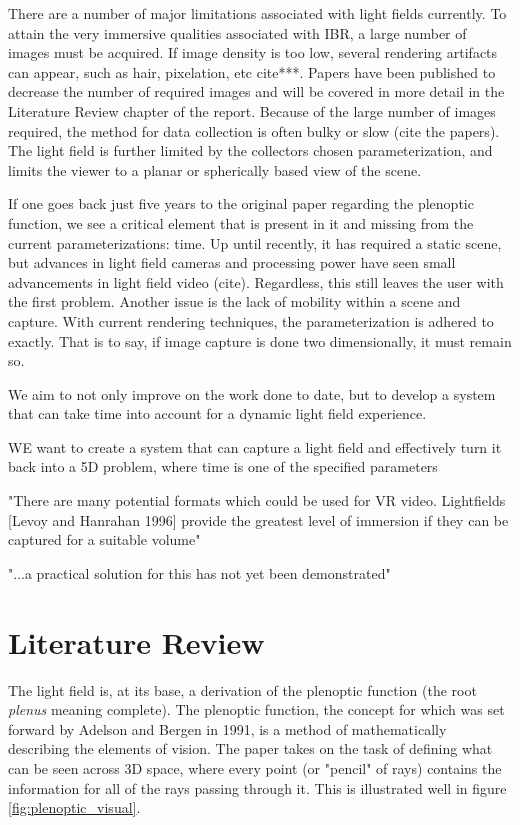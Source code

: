 \documentclass[12pt]{report}
\begin{document}
There are a number of major limitations associated with light fields currently. To attain the very immersive qualities associated with IBR, a large number of images must be acquired. If image density is too low, several rendering artifacts can appear, such as hair, pixelation, etc cite***. Papers have been published to decrease the number of required images and will be covered in more detail in the Literature Review chapter of the report. Because of the large number of images required, the method for data collection is often bulky or slow (cite the papers). The light field is further limited by the collectors chosen parameterization, and limits the viewer to a planar or spherically based view of the scene. 

If one goes back just five years to the original paper regarding the plenoptic function, we see a critical element that is present in it and missing from the current parameterizations: time. Up until recently, it has required a static scene, but advances in light field cameras and processing power have seen small advancements in light field video (cite). Regardless, this still leaves the user with the first problem. Another issue is the lack of mobility within a scene and capture. With current rendering techniques, the parameterization is adhered to exactly. That is to say, if image capture is done two dimensionally, it must remain so. 

We aim to not only improve on the work done to date, but to develop a system that can take time into account for a dynamic light field experience. 

WE want to create a system that can capture a light field and effectively turn it back into a 5D problem, where time is one of the specified parameters

"There are many potential formats which could be used for VR video.
Lightfields [Levoy and Hanrahan 1996] provide the greatest level of
immersion if they can be captured for a suitable volume"

"...a practical solution for this has not yet been demonstrated"

\chapter{Literature Review}
The light field is, at its base, a derivation of the plenoptic function (the root \emph{plenus} meaning complete). The plenoptic function, the concept for which was set forward by Adelson and Bergen in 1991, is a method of mathematically describing the elements of vision. The paper takes on the task of defining what can be seen across 3D space, where every point (or "pencil" of rays) contains the information for all of the rays passing through it. This is illustrated well in figure \ref{fig:plenoptic_visual}.
 
\end{document}
